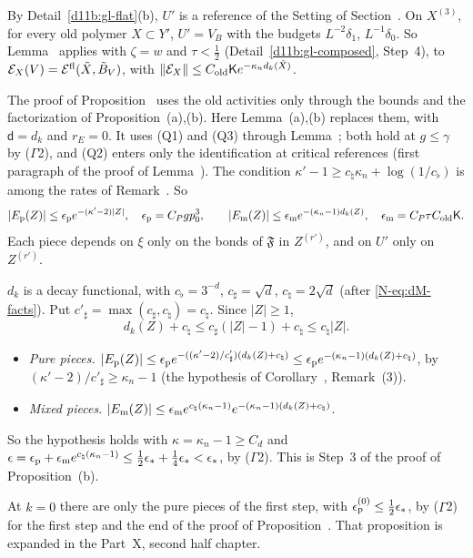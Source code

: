 \begin{step}
By Detail~\ref{d11b:gl-flat}(b), $U'$ is a reference of the Setting of Section~. On $X^{(3)}$, for every old polymer $X\subset Y'$, $U'=V_B$ with the budgets $L^{-2}\delta_1$, $L^{-1}\delta_0$. So Lemma~ applies with $\zeta=w$ and $\tau<\frac12$ (Detail~\ref{d11b:gl-composed}, Step~4), to $\mathcal E_X(V)=\mathcal E^{\rm fl}(\tilde X,\tilde B_V)$, with $\|\mathcal E_X\|\le C_{\rm old}\mathsf Ke^{-\kappa_nd_k(\tilde X)}$.
\end{step}

\begin{step}
The proof of Proposition~ uses the old activities only through the bounds and the factorization of Proposition~(a),(b). Here Lemma~(a),(b) replaces them, with $\mathsf d=d_k$ and $r_E=0$. It uses (Q1) and (Q3) through Lemma~; both hold at $g\le\gamma$ by ($\Gamma$2), and (Q2) enters only the identification at critical references (first paragraph of the proof of Lemma~). The condition $\kappa'-1\ge c_\natural\kappa_n+\log(1/c_\flat)$ is among the rates of Remark~. So
\[
|E_{\rm p}(Z)|\le\epsilon_{\rm p}e^{-(\kappa'-2)|Z|},\quad\epsilon_{\rm p}=C_Pgp_0^3,\qquad|E_{\rm m}(Z)|\le\epsilon_{\rm m}e^{-(\kappa_n-1)d_k(Z)},\quad\epsilon_{\rm m}=C_P\tau C_{\rm old}\mathsf K .
\]
Each piece depends on $\xi$ only on the bonds of $\mathfrak F$ in $Z^{(r')}$, and on $U'$ only on $Z^{(r')}$.
\end{step}

\begin{step}
$d_k$ is a decay functional, with $c_\flat=3^{-d}$, $c_\sharp=\sqrt d$, $c_\natural=2\sqrt d$ (after \eqref{N-eq:dM-facts}). Put $c'_\sharp=\max(c_\sharp,c_\natural)=c_\natural$. Since $|Z|\ge1$,
\[
d_k(Z)+c_\natural\le c_\sharp(|Z|-1)+c_\natural\le c_\natural|Z| .
\]
\begin{itemize}
\item \emph{Pure pieces.} $|E_{\rm p}(Z)|\le\epsilon_{\rm p}e^{-((\kappa'-2)/c'_\sharp)(d_k(Z)+c_\natural)}\le\epsilon_{\rm p}e^{-(\kappa_n-1)(d_k(Z)+c_\natural)}$, by $(\kappa'-2)/c'_\sharp\ge\kappa_n-1$ (the hypothesis of Corollary~, Remark~(3)).
\item \emph{Mixed pieces.} $|E_{\rm m}(Z)|\le\epsilon_{\rm m}e^{c_\natural(\kappa_n-1)}e^{-(\kappa_n-1)(d_k(Z)+c_\natural)}$.
\end{itemize}
So the hypothesis holds with $\kappa=\kappa_n-1\ge C_d$ and $\epsilon=\epsilon_{\rm p}+\epsilon_{\rm m}e^{c_\natural(\kappa_n-1)}\le\frac12\epsilon_*+\frac14\epsilon_*<\epsilon_*$, by ($\Gamma$2). This is Step~3 of the proof of Proposition~(b).

At $k=0$ there are only the pure pieces of the first step, with $\epsilon^{(0)}_{\rm p}\le\frac12\epsilon_*$, by ($\Gamma$2) for the first step and the end of the proof of Proposition~. That proposition is expanded in the Part~X, second half chapter.
\end{step}

